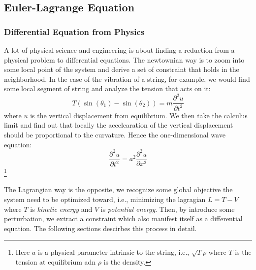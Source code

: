 \subsection{Euler-Lagrange Equation}

%
\providecommand{\argmin}{\operatorname*{arg\,min}}%
\providecommand{\argmax}{\operatorname*{arg\,max}}%
\subsubsection{Differential Equation from Physics}

A lot of physical science and engineering is about finding a reduction from a physical problem to differential equations. The newtownian way is to zoom into some local point of the system and derive a set of constraint that holds in the neighborhood. In the case of the vibration of a string, for example, we would find some local segment of string and analyze the tension that acts on it:
\begin{equation}
T(\sin(\theta_1)-\sin(\theta_2)) = m\frac{\partial^2 u}{\partial t^2}
\end{equation}
where $u$ is the vertical displacement from equilibrium. We then take the calculus limit and find out that locally the accelearation of the vertical displacement should be proportional to the curvature. Hence the one-dimensional wave equation:
\begin{equation}
\frac{\partial^2 u}{\partial t^2}=a^2 \frac{\partial^2 u}{\partial x^2}
\end{equation}
\footnote{Here $a$ is a physical parameter intrinsic to the string, i.e., $\sqrt{T}{\rho}$ where $T$ is the tension at equilibrium adn $\rho$ is the density.}

The Lagrangian way is the opposite, we recognize some global objective the system need to be optimized toward, i.e., minimizing the lagragian $L=T -V$ where $T$ is \textit{kinetic energy} and $V$ is \textit{potential energy}. Then, by introduce some perturbation, we extract a constraint which also manifest itself as a differential equation. The following sections descirbes this process in detail.

